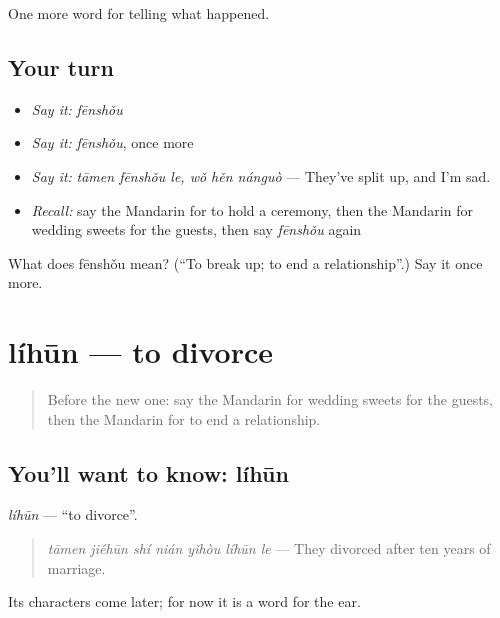 \begin{grammarlens}[title={What you've built}]
One more word for telling what happened.
\end{grammarlens}

\subsection*{Your turn}
\begin{itemize}
\raggedright
  \item \emph{Say it:} \emph{fēnshǒu}
  \item \emph{Say it:} \emph{fēnshǒu}, once more
  \item \emph{Say it:} \emph{tāmen fēnshǒu le, wǒ hěn nánguò} — They've split up, and I'm sad.
  \item \emph{Recall:} say the Mandarin for to hold a ceremony, then the Mandarin for wedding sweets for the guests, then say \emph{fēnshǒu} again
\end{itemize}

\begin{tcolorbox}[breakable,colback=teal!4,colframe=teal!35!black,title={Before you move on}]
What does fēnshǒu mean? (\textquotedblleft{}To break up; to end a relationship\textquotedblright{}.) Say it once more.
\end{tcolorbox}
\section[líhūn]{líhūn — to divorce}

\label{lesson:ZH-C307-lihun}



\begin{quote}
Before the new one: say the Mandarin for wedding sweets for the guests, then the Mandarin for to end a relationship.
\end{quote}

\subsection*{You'll want to know: líhūn}
\emph{líhūn} — \textquotedblleft{}to divorce\textquotedblright{}.

\begin{quote}
\emph{tāmen jiéhūn shí nián yǐhòu líhūn le} — They divorced after ten years of marriage.
\end{quote}

Its characters come later; for now it is a word for the ear.


